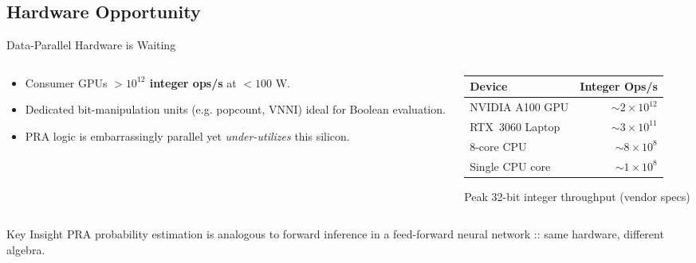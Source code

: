\subsection{Hardware Opportunity}
\begin{frame}[t]{Data-Parallel Hardware is Waiting}
  \begin{columns}[T]
    \begin{column}{0.55\textwidth}
      \begin{itemize}
        \item Consumer GPUs \textbf{\small$>10^{12}$ integer ops/s} at $<100$ W.
        \item Dedicated bit-manipulation units (e.g. popcount, VNNI) ideal for Boolean evaluation.
        \item PRA logic is embarrassingly parallel yet \emph{under-utilizes} this silicon.
      \end{itemize}
    \end{column}
    \begin{column}{0.4\textwidth}
      \centering
        \begin{tabular}{lr}
          \toprule
          \textbf{Device} & \textbf{Integer Ops/s} \\
          \midrule
          NVIDIA A100 GPU & $\sim2\times10^{12}$ \\
          RTX~3060 Laptop & $\sim3\times10^{11}$ \\
          8-core CPU & $\sim8\times10^{8}$ \\
          Single CPU core & $\sim1\times10^{8}$ \\
          \bottomrule
        \end{tabular}
        \scriptsize Peak 32-bit integer throughput (vendor specs)
    \end{column}
  \end{columns}
  \vspace{6pt}
  \begin{block}{Key Insight}
    PRA probability estimation is analogous to forward inference in a feed-forward neural network :: same hardware, different algebra.
  \end{block}
\end{frame}
